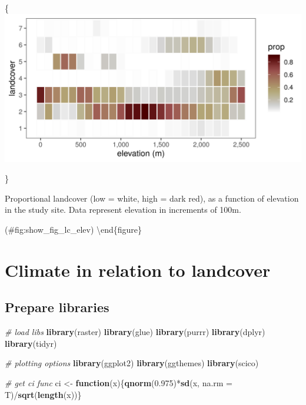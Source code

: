 \documentclass[]{article}
\newenvironment{Shaded}{}{}
\newcommand{\CommentTok}[1]{\textcolor[rgb]{0.38,0.63,0.69}{\textit{#1}}}
\newcommand{\ControlFlowTok}[1]{\textcolor[rgb]{0.00,0.44,0.13}{\textbf{#1}}}
\newcommand{\DataTypeTok}[1]{\textcolor[rgb]{0.56,0.13,0.00}{#1}}
\newcommand{\FloatTok}[1]{\textcolor[rgb]{0.25,0.63,0.44}{#1}}
\newcommand{\KeywordTok}[1]{\textcolor[rgb]{0.00,0.44,0.13}{\textbf{#1}}}
\newcommand{\NormalTok}[1]{#1}
\newcommand{\OperatorTok}[1]{\textcolor[rgb]{0.40,0.40,0.40}{#1}}
\newcommand{\StringTok}[1]{\textcolor[rgb]{0.25,0.44,0.63}{#1}}
\begin{document}
\{\centering \includegraphics[width=\textwidth]{figs/fig_lc_elev}

\}

\caption{Proportional landcover (low = white, high = dark red), as a function of elevation in the study site. Data represent elevation in increments of 100m.}

(\#fig:show\_fig\_lc\_elev)
\textbackslash{}end\{figure\}

\hypertarget{climate-in-relation-to-landcover}{%
\section{Climate in relation to landcover}\label{climate-in-relation-to-landcover}}

\hypertarget{prepare-libraries-3}{%
\subsection{Prepare libraries}\label{prepare-libraries-3}}

\begin{Shaded}
\begin{Highlighting}[]
\CommentTok{# load libs}
\KeywordTok{library}\NormalTok{(raster)}
\KeywordTok{library}\NormalTok{(glue)}
\KeywordTok{library}\NormalTok{(purrr)}
\KeywordTok{library}\NormalTok{(dplyr)}
\KeywordTok{library}\NormalTok{(tidyr)}

\CommentTok{# plotting options}
\KeywordTok{library}\NormalTok{(ggplot2)}
\KeywordTok{library}\NormalTok{(ggthemes)}
\KeywordTok{library}\NormalTok{(scico)}

\CommentTok{# get ci func}
\NormalTok{ci <-}\StringTok{ }\ControlFlowTok{function}\NormalTok{(x)\{}\KeywordTok{qnorm}\NormalTok{(}\FloatTok{0.975}\NormalTok{)}\OperatorTok{*}\KeywordTok{sd}\NormalTok{(x, }\DataTypeTok{na.rm =}\NormalTok{ T)}\OperatorTok{/}\KeywordTok{sqrt}\NormalTok{(}\KeywordTok{length}\NormalTok{(x))\}}
\end{Highlighting}
\end{Shaded}
\end{document}
